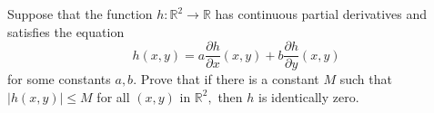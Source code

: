 Suppose that the function $h:\mathbb{R}^2\to\mathbb{R}$ has continuous partial derivatives and satisfies the equation
\[h(x,y)=a\frac{\partial h}{\partial x}(x,y)+b\frac{\partial h}{\partial y}(x,y)\]
for some constants $a,b.$ Prove that if there is a constant $M$ such that $|h(x,y)|\le M$ for all $(x,y)$ in $\mathbb{R}^2,$ then $h$ is identically zero.